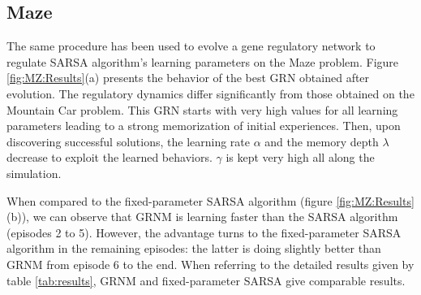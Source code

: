 \subsection{Maze}
The same procedure has been used to evolve a gene regulatory network to regulate SARSA algorithm's learning parameters on the Maze problem. Figure \ref{fig:MZ:Results}(a) presents the behavior of the best GRN obtained after evolution. The regulatory dynamics differ significantly from those obtained on the Mountain Car problem. This GRN starts with very high values for all learning parameters leading to a strong memorization of initial experiences. Then, upon discovering successful solutions, the learning rate $\alpha$ and the memory depth $\lambda$ decrease to exploit the learned behaviors. $\gamma$ is kept very high all along the simulation.

When compared to the fixed-parameter SARSA algorithm (figure \ref{fig:MZ:Results}(b)), we can observe that GRNM is learning faster than the SARSA algorithm (episodes 2 to 5). However, the advantage turns to the fixed-parameter SARSA algorithm in the remaining episodes: the latter is doing slightly better than GRNM from episode 6 to the end. When referring to the detailed results given by table \ref{tab:results}, GRNM and fixed-parameter SARSA give comparable results. 

